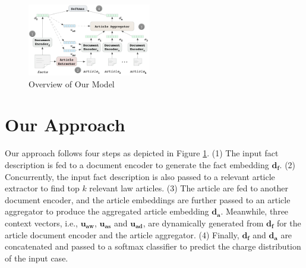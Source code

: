 
\begin{figure}[t!]
\begin{center}
\includegraphics[width=0.48\textwidth]{figures/charge_pred_overview.png}	
\caption{Overview of Our Model}
\label{fig_model_framework}
\end{center}
\end{figure}

\section{Our Approach}
Our approach follows four steps as depicted in Figure \ref{fig_model_framework}. 
(1) The input fact description is fed to a document encoder to generate the fact embedding $\mathbf{d_f}$.
(2) Concurrently, the input fact description is also passed to a relevant article extractor to find top $k$ relevant law articles. 
(3) The article are fed to another document encoder, and the article embeddings are further passed to an article aggregator to produce the aggregated article embedding $\mathbf{d_a}$. Meanwhile, three context vectors, i.e., $\mathbf{u_{aw}}$, $\mathbf{u_{as}}$ and $\mathbf{u_{ad}}$, are dynamically generated from $\mathbf{d_f}$ for the article document encoder and the article aggregator. 
(4) Finally, $\mathbf{d_f}$ and $\mathbf{d_a}$ are concatenated and passed to a softmax classifier to predict the charge distribution of the input case.


